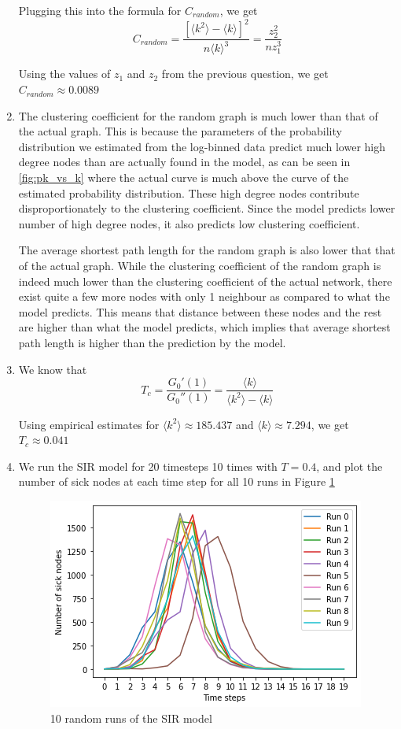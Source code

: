 \documentclass{article}
\begin{document}
\begin{enumerate}
Plugging this into the formula for $C_{random}$, we get $$C_{random} = \frac{[\langle k^2 \rangle - \langle k \rangle]^2}{n\langle k \rangle^3} = \frac{z_2^2}{n z_1^3}$$

Using the values of $z_1$ and $z_2$ from the previous question, we get $C_{random} \approx 0.0089$

\item The clustering coefficient for the random graph is much lower than that of the actual graph. This is because the parameters of the probability distribution we estimated from the log-binned data predict much lower high degree nodes than are actually found in the model, as can be seen in \ref{fig:pk_vs_k} where the actual curve is much above the curve of the estimated probability distribution. These high degree nodes contribute disproportionately to the clustering coefficient. Since the model predicts lower number of high degree nodes, it also predicts low clustering coefficient.

The average shortest path length for the random graph is also lower that that of the actual graph. While the clustering coefficient of the random graph is indeed much lower than the clustering coefficient of the actual network, there exist quite a few more nodes with only 1 neighbour as compared to what the model predicts. This means that distance between these nodes and the rest are higher than what the model predicts, which implies that average shortest path length is higher than the prediction by the model. 

\item We know that $$T_c = \frac{G_0'(1)}{G_0''(1)} = \frac{\langle k \rangle }{\langle k^2 \rangle - \langle k \rangle }$$

Using empirical estimates for  $\langle k^2 \rangle \approx 185.437$ and $\langle k \rangle \approx 7.294$, we get $T_c \approx 0.041$

\item We run the SIR model for 20 timesteps 10 times with $T=0.4$, and plot the number of sick nodes at each time step for all 10 runs in Figure \ref{fig:random_SIR_runs}

\begin{figure}
\centering
\includegraphics[scale=0.5]{random_SIR_runs.png}
\caption{10 random runs of the SIR model}
\label{fig:random_SIR_runs}


\end{figure}
\end{enumerate}
\end{document}
